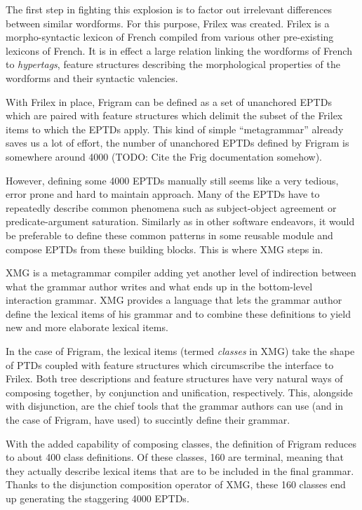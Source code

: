 The first step in fighting this explosion is to factor out irrelevant
differences between similar wordforms. For this purpose, Frilex was
created. Frilex is a morpho-syntactic lexicon of French compiled from
various other pre-existing lexicons of French. It is in effect a large
relation linking the wordforms of French to \emph{hypertags}, feature
structures describing the morphological properties of the wordforms and
their syntactic valencies.

With Frilex in place, Frigram can be defined as a set of unanchored
EPTDs which are paired with feature structures which delimit the subset
of the Frilex items to which the EPTDs apply. This kind of simple
``metagrammar'' already saves us a lot of effort, the number of
unanchored EPTDs defined by Frigram is somewhere around 4000 (TODO: Cite
the Frig documentation somehow).

However, defining some 4000 EPTDs manually still seems like a very
tedious, error prone and hard to maintain approach. Many of the EPTDs
have to repeatedly describe common phenomena such as subject-object
agreement or predicate-argument saturation. Similarly as in other
software endeavors, it would be preferable to define these common
patterns in some reusable module and compose EPTDs from these building
blocks. This is where XMG steps in.

XMG is a metagrammar compiler adding yet another level of indirection
between what the grammar author writes and what ends up in the
bottom-level interaction grammar. XMG provides a language that lets the
grammar author define the lexical items of his grammar and to combine
these definitions to yield new and more elaborate lexical items.

In the case of Frigram, the lexical items (termed \emph{classes} in XMG)
take the shape of PTDs coupled with feature structures which
circumscribe the interface to Frilex. Both tree descriptions and feature
structures have very natural ways of composing together, by conjunction
and unification, respectively. This, alongside with disjunction, are the
chief tools that the grammar authors can use (and in the case of
Frigram, have used) to succintly define their grammar.

With the added capability of composing classes, the definition of
Frigram reduces to about 400 class definitions. Of these classes, 160
are terminal, meaning that they actually describe lexical items that are
to be included in the final grammar. Thanks to the disjunction
composition operator of XMG, these 160 classes end up generating the
staggering 4000 EPTDs.



